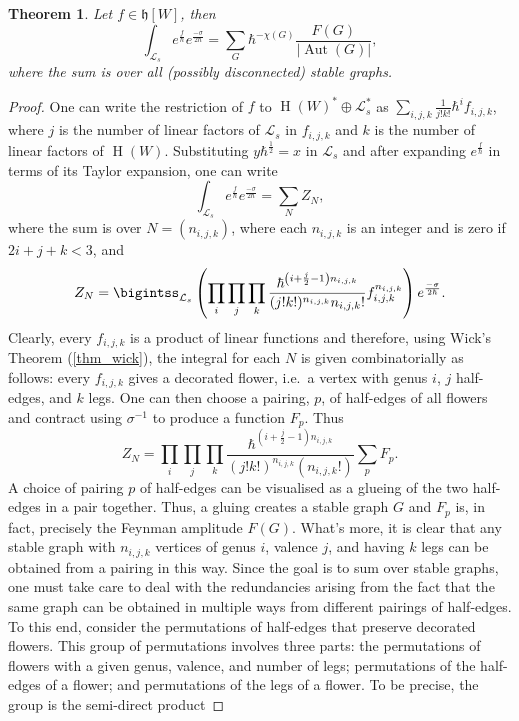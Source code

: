 \documentclass[]{amsart}
\newtheorem{theorem}{Theorem}[section]
\theoremstyle{definition}
\newcommand{\homology}{\operatorname{H}}
\begin{document}
\begin{theorem}\label{thm_disconnected_graphs}
Let $f\in\mathfrak{h}[W]$, then
\[
\int_{\mathcal{L}_s} e^{\frac{f}{\hbar}} e^{\frac{-\sigma}{2\hbar} } = \sum_{G} \hbar^{-\chi(G)} \frac{F(G)}{|\operatorname{Aut}(G)|},
\]
where the sum is over all (possibly disconnected) stable graphs.
\end{theorem}
\begin{proof}
One can write the restriction of $f$ to $\homology(W)^*\oplus \mathcal{L}_s^*$ as $\sum_{i,j,k} \frac{1}{j!k!} \hbar^i f_{i,j,k} $, where $j$ is the number of linear factors of $\mathcal{L}_s$ in $f_{i,j,k}$ and $k$ is the number of linear factors of $\homology (W)$. Substituting $y \hbar^{\frac{1}{2}}=x$ in $\mathcal{L}_s$ and after expanding $e^{\frac{f}{\hbar}}$ in terms of its Taylor expansion, one can write
\[
\int_{\mathcal{L}_s} e^{\frac{f}{\hbar}} e^{\frac{-\sigma}{2 \hbar} } = \sum_{N} Z_N,
\]
where the sum is over $N=(n_{i,j,k})$, where each $n_{i,j,k}$ is an integer and is zero if $2i+j+k < 3$, and
\[
Z_N = \bigintss_{\mathcal{L}_s} \left( \prod_{i} \prod_{j} \prod_k \frac{\hbar^{\left(i+\frac{j}{2} -1 \right) n_{i,j,k}}}{(j!k!)^{n_{i,j,k}} n_{i,j,k}!} f_{i,j,k}^{n_{i,j,k}} \right) e^{\frac{-\sigma}{2 \hbar} }.
\]
Clearly, every $f_{i,j,k}$ is a product of linear functions and therefore, using Wick's Theorem (\ref{thm_wick}), the integral for each $N$ is given combinatorially as follows: every $f_{i,j,k}$ gives a decorated flower, i.e.\ a vertex with genus $i$, $j$ half-edges, and $k$ legs. One can then choose a pairing, $p$, of half-edges of all flowers and contract using $\sigma^{-1}$ to produce a function $F_p$. Thus
\[
Z_N = \prod_{i} \prod_{j} \prod_k \frac{\hbar^{\left(i+\frac{j}{2} - 1 \right) n_{i,j,k} }}{(j!k!)^{n_{i,j,k}} (n_{i,j,k}!)} \sum_{p} F_p.
\]
A choice of pairing $p$ of half-edges can be visualised as a glueing of the two half-edges in a pair together. Thus, a gluing creates a stable graph $G$ and $F_p$ is, in fact, precisely the Feynman amplitude $F(G)$. What's more, it is clear that any stable graph with $n_{i,j,k}$ vertices of genus $i$, valence $j$, and having $k$ legs can be obtained from a pairing in this way. Since the goal is to sum over stable graphs, one must take care to deal with the redundancies arising from the fact that the same graph can be obtained in multiple ways from different pairings of half-edges. To this end, consider the permutations of half-edges that preserve decorated flowers. This group of permutations involves three parts: the permutations of flowers with a given genus, valence, and number of legs; permutations of the half-edges of a flower; and permutations of the legs of a flower. To be precise, the group is the semi-direct product

\end{proof}
\end{document}

